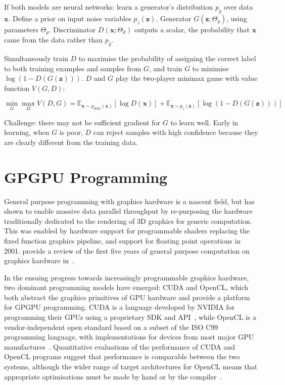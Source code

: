 If both models are neural networks: learn a generator's distribution $p_g$ over data $\bm{x}$. Define a prior on input noise variables $p_z(\bm{z})$. Generator $G(\bm{z}; \Theta_g)$, using parameters $\Theta_g$. Discriminator $D(\bm{x}; \Theta_d)$ outputs a scalar, the probability that $\bm{x}$ came from the data rather than $p_g$.

Simultaneously train $D$ to maximise the probability of assigning the correct label to both training examples and samples from $G$, and train $G$ to minimise $\log (1 - D(G(\bm{z})))$. $D$ and $G$ play the two-player minimax game with value function $V(G, D)$:

\[ \min_G \max_D V(D, G) = \mathbb{E}_{\bm{x} \sim  p_{data}(\bm{x})} [ \log D(\bm{x}) ] + \mathbb{E}_{\bm{z} \sim p_z(\bm{z})} [ \log (1 - D(G(\bm{z}))) ] \]

Challenge: there may not be sufficient gradient for $G$ to learn well. Early in learning, when $G$ is poor, $D$ can reject samples with high confidence because they are clearly different from the training data.


\section{GPGPU Programming}
\label{subsec:background-gpgpu}

General purpose programming with graphics hardware is a nascent field, but has shown to enable massive data parallel throughput by re-purposing the hardware traditionally dedicated to the rendering of 3D graphics for generic computation. This was enabled by hardware support for programmable shaders replacing the fixed function graphics pipeline, and support for floating point operations in 2001. \citeauthor{Owens2006} provide a review of the first five years of general purpose computation on graphics hardware in~\cite{Owens2006}.

In the ensuing progress towards increasingly programmable graphics hardware, two dominant programming models have emerged: CUDA and OpenCL, which both abstract the graphics primitives of GPU hardware and provide a platform for GPGPU programming. CUDA is a language developed by NVIDIA for programming their GPUs using a proprietary SDK and API~\cite{Nvidia2007}, while OpenCL is a vendor-independent open standard based on a subset of the ISO C99 programming language, with implementations for devices from most major GPU manufactures~\cite{Stone2010}. Quantitative evaluations of the performance of CUDA and OpenCL programs suggest that performance is comparable between the two systems, although the wider range of target architectures for OpenCL means that appropriate optimisations must be made by hand or by the compiler~\cite{Komatsu2010,Karimi2010}.

